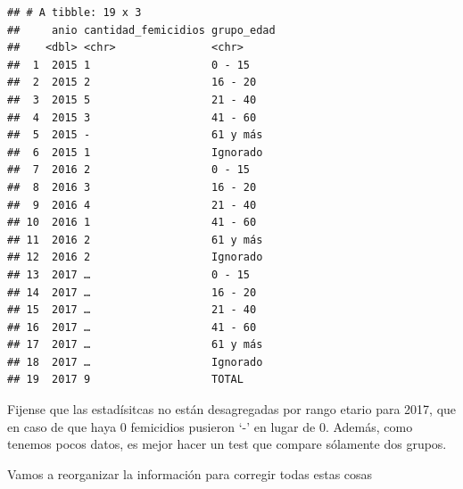 \documentclass[]{book}
\begin{document}
\begin{verbatim}
## # A tibble: 19 x 3
##     anio cantidad_femicidios grupo_edad
##    <dbl> <chr>               <chr>     
##  1  2015 1                   0 - 15    
##  2  2015 2                   16 - 20   
##  3  2015 5                   21 - 40   
##  4  2015 3                   41 - 60   
##  5  2015 -                   61 y más  
##  6  2015 1                   Ignorado  
##  7  2016 2                   0 - 15    
##  8  2016 3                   16 - 20   
##  9  2016 4                   21 - 40   
## 10  2016 1                   41 - 60   
## 11  2016 2                   61 y más  
## 12  2016 2                   Ignorado  
## 13  2017 …                   0 - 15    
## 14  2017 …                   16 - 20   
## 15  2017 …                   21 - 40   
## 16  2017 …                   41 - 60   
## 17  2017 …                   61 y más  
## 18  2017 …                   Ignorado  
## 19  2017 9                   TOTAL
\end{verbatim}

Fijense que las estadísitcas no están desagregadas por rango etario para 2017, que en caso de que haya 0 femicidios pusieron `-' en lugar de 0. Además, como tenemos pocos datos, es mejor hacer un test que compare sólamente dos grupos.

Vamos a reorganizar la información para corregir todas estas cosas
\end{document}
